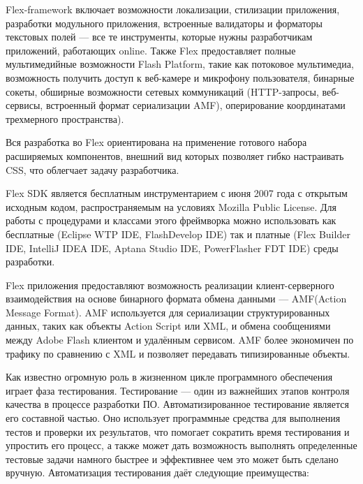 Flex-framework включает возможности локализации, стилизации приложения, разработки модульного приложения, 
встроенные валидаторы и форматоры текстовых полей --- все те инструменты, которые нужны разработчикам
приложений, работающих online. Также Flex предоставляет полные мультимедийные возможности Flash 
Platform, такие как потоковое мультимедиа, возможность получить доступ к веб-камере и микрофону
пользователя, бинарные сокеты, обширные возможности сетевых коммуникаций (HTTP-запросы, веб-сервисы, 
встроенный формат сериализации AMF), оперирование координатами трехмерного пространства).

Вся разработка во Flex ориентирована на применение готового набора расширяемых компонентов,
внешний вид которых позволяет гибко настраивать CSS, что облегчает задачу разработчика.

Flex SDK является бесплатным инструментарием с июня 2007 года с открытым исходным кодом,
распространяемым на условиях Mozilla Public License. Для работы с процедурами и классами этого фреймворка
можно использовать как бесплатные (Eclipse WTP IDE, FlashDevelop IDE) так и платные
(Flex Builder IDE, IntelliJ IDEA IDE, Aptana Studio IDE, PowerFlasher FDT IDE) среды разработки.

Flex приложения предоставляют возможность реализации клиент-серверного взаимодействия 
на основе бинарного формата обмена данными --- AMF(Action Message Format). AMF
используется для сериализации структурированных данных, таких как объекты Action Script 
или XML, и обмена сообщениями между Adobe Flash клиентом и удалённым сервисом. 
AMF более экономичен по трафику по сравнению с XML и позволяет передавать типизированные объекты.

Как известно огромную роль в жизненном цикле программного обеспечения играет фаза тестирования.
Тестирование — один из важнейших этапов контроля качества в процессе разработки ПО.
Автоматизированное тестирование является его составной частью. Оно использует программные средства для
выполнения тестов и проверки их результатов, что помогает сократить
время тестирования и упростить его процесс, а также может 
дать возможность выполнять определенные тестовые задачи намного быстрее и 
эффективнее чем это может быть сделано вручную. Автоматизация тестирования 
даёт следующие преимущества: 

